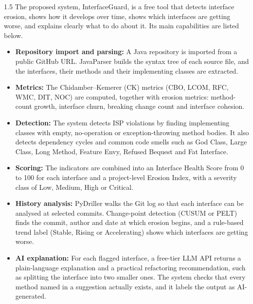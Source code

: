 \documentclass[12pt,a4paper]{article}
\begin{document}
\begin{spacing}{1.5}
\justifying
The proposed system, InterfaceGuard, is a free tool that detects interface
erosion, shows how it develops over time, shows which interfaces are getting
worse, and explains clearly what to do about it. Its main capabilities
are listed below.

\begin{itemize}[leftmargin=*,itemsep=2pt]
  \item \textbf{Repository import and parsing:} A Java repository is
        imported from a public GitHub URL. JavaParser builds the syntax
        tree of each source file, and the interfaces, their methods and
        their implementing classes are extracted.

  \item \textbf{Metrics:} The Chidamber--Kemerer (CK) metrics (CBO, LCOM,
        RFC, WMC, DIT, NOC) are computed, together with erosion metrics:
        method-count growth, interface churn, breaking change count and
        interface cohesion.

  \item \textbf{Detection:} The system detects ISP violations by finding
        implementing classes with empty, no-operation or exception-throwing
        method bodies. It also detects dependency cycles and common code
        smells such as God Class, Large Class, Long Method, Feature Envy,
        Refused Bequest and Fat Interface.

  \item \textbf{Scoring:} The indicators are combined into an Interface
        Health Score from 0 to 100 for each interface and a project-level
        Erosion Index, with a severity class of Low, Medium, High or Critical.

  \item \textbf{History analysis:} PyDriller walks the Git log so that
        each interface can be analysed at selected commits. Change-point
        detection (CUSUM or PELT) finds the commit, author and date at which
        erosion begins, and a rule-based trend label (Stable, Rising or
        Accelerating) shows which interfaces are getting worse.

  \item \textbf{AI explanation:} For each flagged interface, a free-tier
        LLM API returns a plain-language explanation and a practical
        refactoring recommendation, such as splitting the interface into
        two smaller ones. The system checks that every method named in a
        suggestion actually exists, and it labels the output as AI-generated.


\end{itemize}
\end{spacing}
\end{document}
